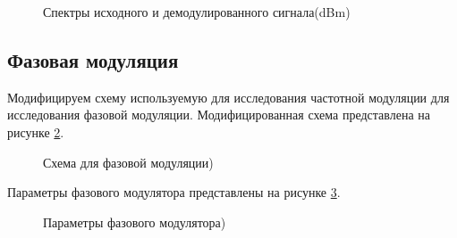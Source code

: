 \documentclass[a4paper,14pt]{extarticle}
\begin{document}
\begin{figure}[H]
\caption{Спектры исходного и демодулированного сигнала(dBm)}
\label{21}
\end{figure}


\subsection{Фазовая модуляция}

Модифицируем схему используемую для исследования частотной модуляции для исследования фазовой модуляции. Модифицированная схема представлена на рисунке \ref{22}.

\begin{figure}[H]
\caption{Схема для фазовой модуляции)}
\label{22}
\end{figure}

Параметры фазового модулятора представлены на рисунке \ref{23}.

\begin{figure}[H]
\caption{Параметры фазового модулятора)}
\label{23}
\end{figure}
\end{document}
